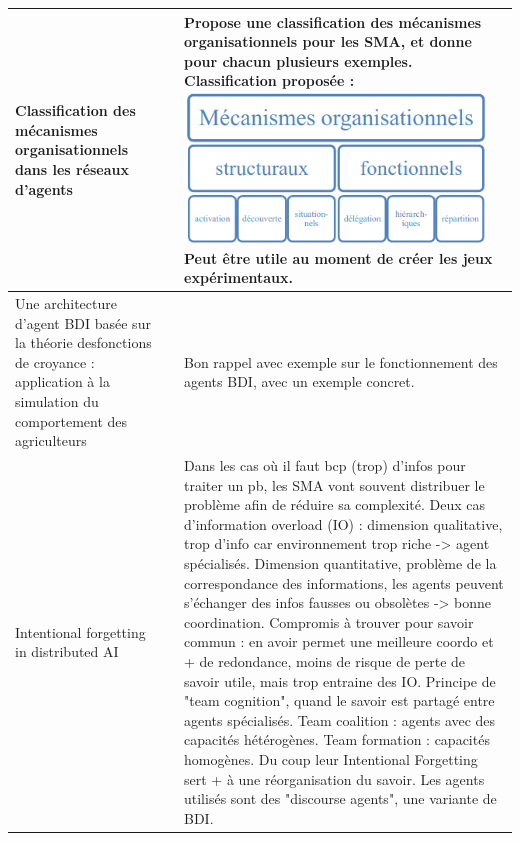 \documentclass[french]{article}
\begin{document}
    \begin{table}[ht!]
        \begin{center}
        \begin{tabular}{|p{}|p{}|p{}|}
            \hline
            
            Classification des mécanismes organisationnels dans les réseaux d’agents \cite{lacomme_classification_2009}
            & 
            & Propose une classification des mécanismes organisationnels pour les SMA, et donne pour chacun plusieurs exemples. Classification proposée :
            \includegraphics[width=8cm]{images/meca_orga.png}
            Peut être utile au moment de créer les jeux expérimentaux.
            \\
            \hline
            Une architecture d’agent BDI basée sur la théorie desfonctions de croyance : application à la simulation du comportement des agriculteurs \cite{taillandier_architecture_2012}
            &
            & Bon rappel avec exemple sur le fonctionnement des agents BDI, avec un exemple concret. \\
            \hline
            Intentional forgetting in distributed AI \cite{reuter_intentional_2019}
            &
            & Dans les cas où il faut bcp (trop) d'infos pour traiter un pb, les SMA vont souvent distribuer le problème afin de réduire sa complexité.
            Deux cas d'information overload (IO) : dimension qualitative, trop d'info car environnement trop riche -> agent spécialisés. Dimension quantitative, problème de la correspondance des informations, les agents peuvent s'échanger des infos fausses ou obsolètes -> bonne coordination.
            Compromis à trouver pour savoir commun : en avoir permet une meilleure coordo et + de redondance, moins de risque de perte de savoir utile, mais trop entraine des IO. 
            Principe de "team cognition", quand le savoir est partagé entre agents spécialisés. Team coalition : agents avec des capacités hétérogènes. Team formation : capacités homogènes. Du coup leur Intentional Forgetting sert + à une réorganisation du savoir.
            Les agents utilisés sont des "discourse agents", une variante de BDI.

\end{tabular}
\end{center}
\end{table}
\end{document}
